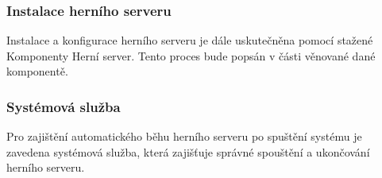 \subsubsection{Instalace herního serveru}

Instalace a konfigurace herního serveru je dále uskutečněna pomocí stažené Komponenty Herní server. Tento proces bude popsán v části věnované dané komponentě.

\subsubsection{Systémová služba}

Pro zajištění automatického běhu herního serveru po spuštění systému je zavedena systémová služba, která zajišťuje správné spouštění
a ukončování herního serveru.